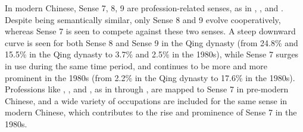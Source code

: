 \begin{exe}
  \newpage
\end{exe}

In modern Chinese, Sense 7, 8, 9 are profession-related senses, as in , , and . Despite being semantically similar, only Sense 8 and 9 evolve cooperatively, whereas Sense 7 is seen to compete against these two senses. A steep downward curve is seen for both Sense 8 and Sense 9 in the Qing dynasty (from 24.8\% and 15.5\% in the Qing dynasty to 3.7\% and 2.5\% in the 1980s), while Sense 7 surges in use during the same time period, and continues to be more and more prominent in the 1980s (from 2.2\% in the Qing dynasty to 17.6\% in the 1980s). Professions like , , and , as in  through , are mapped to Sense 7 in pre-modern Chinese, and a wide variety of occupations are included for the same sense in modern Chinese, which contributes to the rise and prominence of Sense 7 in the 1980s.

